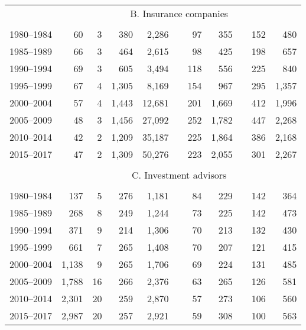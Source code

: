 \documentclass{article}
\begin{document}
\begin{table}[h]
{\begin{tabular}{rrrrrrrrrrr}
            \cline{2-11}
            \\[-2.5ex]
            & \multicolumn{10}{c}{B. Insurance companies} \\ \cline{2-11}
            \\[-2.5ex]
            1980–1984 & 60 & 3 & 380 & 2,286 & & 97 & 355 & & 152 & 480 \\
            1985–1989 & 66 & 3 & 464 & 2,615 & & 98 & 425 & & 198 & 657 \\
            1990–1994 & 69 & 3 & 605 & 3,494 & & 118 & 556 & & 225 & 840 \\
            1995–1999 & 67 & 4 & 1,305 & 8,169 & & 154 & 967 & & 295 & 1,357 \\
            2000–2004 & 57 & 4 & 1,443 & 12,681 & & 201 & 1,669 & & 412 & 1,996 \\
            2005–2009 & 48 & 3 & 1,456 & 27,092 & & 252 & 1,782 & & 447 & 2,268 \\
            2010–2014 & 42 & 2 & 1,209 & 35,187 & & 225 & 1,864 & & 386 & 2,168 \\
            2015–2017 & 47 & 2 & 1,309 & 50,276 & & 223 & 2,055 & & 301 & 2,267 \\
    
            \cline{2-11}
            \\[-2.5ex]
            & \multicolumn{10}{c}{C. Investment advisors} \\ \cline{2-11}
            \\[-2.5ex]
            1980–1984 & 137 & 5 & 276 & 1,181 & & 84 & 229 & & 142 & 364 \\
            1985–1989 & 268 & 8 & 249 & 1,244 & & 73 & 225 & & 142 & 473 \\
            1990–1994 & 371 & 9 & 214 & 1,306 & & 70 & 213 & & 132 & 430 \\
            1995–1999 & 661 & 7 & 265 & 1,408 & & 70 & 207 & & 121 & 415 \\
            2000–2004 & 1,138 & 9 & 265 & 1,706 & & 69 & 224 & & 131 & 485 \\
            2005–2009 & 1,788 & 16 & 266 & 2,376 & & 63 & 265 & & 126 & 581 \\
            2010–2014 & 2,301 & 20 & 259 & 2,870 & & 57 & 273 & & 106 & 560 \\
            2015–2017 & 2,987 & 20 & 257 & 2,921 & & 59 & 308 & & 100 & 563 \\
            

\end{tabular}}
\end{table}
\end{document}
